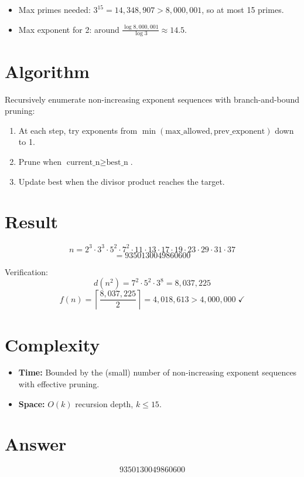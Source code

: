 \documentclass[12pt,a4paper]{article}
\begin{document}
\begin{itemize}
    \item Max primes needed: $3^{15} = 14{,}348{,}907 > 8{,}000{,}001$, so at most 15 primes.
    \item Max exponent for 2: around $\frac{\log 8{,}000{,}001}{\log 3} \approx 14.5$.
\end{itemize}

\section{Algorithm}

Recursively enumerate non-increasing exponent sequences with branch-and-bound pruning:

\begin{enumerate}
    \item At each step, try exponents from $\min(\text{max\_allowed}, \text{prev\_exponent})$ down to 1.
    \item Prune when $\text{current\_n} \geq \text{best\_n}$.
    \item Update best when the divisor product reaches the target.
\end{enumerate}

\section{Result}

\[
n = 2^3 \cdot 3^3 \cdot 5^2 \cdot 7^2 \cdot 11 \cdot 13 \cdot 17 \cdot 19 \cdot 23 \cdot 29 \cdot 31 \cdot 37
\]
\[
= \boxed{9350130049860600}
\]

Verification:
\[
d(n^2) = 7^2 \cdot 5^2 \cdot 3^{8} = 8{,}037{,}225
\]
\[
f(n) = \left\lceil \frac{8{,}037{,}225}{2} \right\rceil = 4{,}018{,}613 > 4{,}000{,}000 \; \checkmark
\]

\section{Complexity}

\begin{itemize}
    \item \textbf{Time:} Bounded by the (small) number of non-increasing exponent sequences with effective pruning.
    \item \textbf{Space:} $O(k)$ recursion depth, $k \leq 15$.
\end{itemize}

\section{Answer}

\[
\boxed{9350130049860600}
\]
\end{document}
